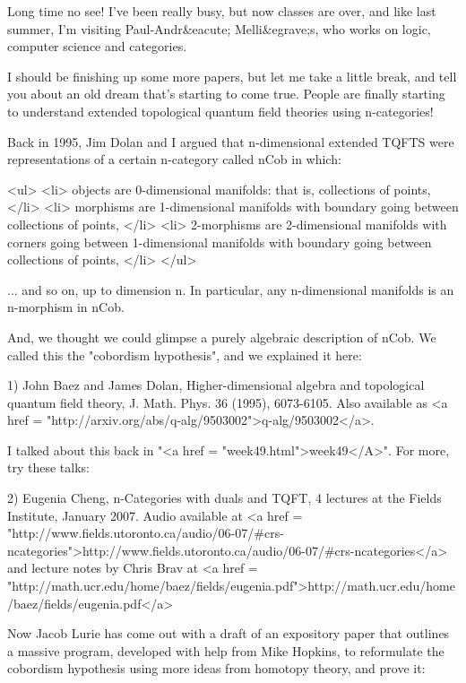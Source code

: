 


Long time no see!  I've been really busy, but now classes are over,
and like last summer, I'm visiting Paul-Andr&eacute; Melli&egrave;s,
who works on logic, computer science and categories.

I should be finishing up some more papers, but let me take a little 
break, and tell you about an old dream that's starting to come true.
People are finally starting to understand extended topological
quantum field theories using n-categories!   

Back in 1995, Jim Dolan and I argued that n-dimensional extended 
TQFTS were representations of a certain n-category called nCob in 
which:

<ul>
<li>
 objects are 0-dimensional manifolds: that is, collections of points,
</li>
<li>
 morphisms are 1-dimensional manifolds with boundary going between
 collections of points,
</li>
<li>
 2-morphisms are 2-dimensional manifolds with corners going between
 1-dimensional manifolds with boundary going between collections of
 points,
</li>
</ul>

... and so on, up to dimension n.  In particular, any n-dimensional
manifolds is an n-morphism in nCob.  

And, we thought we could glimpse a purely algebraic description of
nCob.  We called this the "cobordism hypothesis", and we explained 
it here:

1) John Baez and James Dolan, Higher-dimensional algebra and
topological quantum field theory, J. Math. Phys. 36 (1995), 6073-6105.
Also available as <a href =
"http://arxiv.org/abs/q-alg/9503002">q-alg/9503002</a>.

I talked about this back in "<a href =
"week49.html">week49</A>".  For more, try these talks:

2) Eugenia Cheng, n-Categories with duals and TQFT, 4 lectures at the
Fields Institute, January 2007.  Audio available at
<a href = "http://www.fields.utoronto.ca/audio/06-07/#crs-ncategories">http://www.fields.utoronto.ca/audio/06-07/#crs-ncategories</a>
and lecture notes by Chris Brav at
<a href = "http://math.ucr.edu/home/baez/fields/eugenia.pdf">http://math.ucr.edu/home/baez/fields/eugenia.pdf</a>

Now Jacob Lurie has come out with a draft of an expository paper 
that outlines a massive program, developed with help from Mike Hopkins,
to reformulate the cobordism hypothesis using more ideas from homotopy theory, and prove it:

